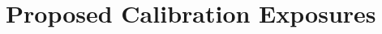 %
%
\section{Proposed Calibration Exposures}
\label{sec:CalibrationExposures}

\begingroup                             %
\newcommand{\DspotProjector}{D_{\mbox{\tiny spot}}} %
\newcommand{\OverfillFactor}{f_D}                   %
\newcommand{\DlambdaFilter}{\Delta_\lambda}         %
\newcommand{\DlambdaFlat}{\Delta_{\lambda,\mbox{\tiny flat}}}   %
\newcommand{\DlambdaOffset}{\Delta_{\lambda,\mbox{\tiny hole}}} %
\newcommand{\DlambdaWhite}{\Delta_{\lambda,\mbox{\tiny white}}} %
\newcommand{\Nband}{N_b}                                        %
\newcommand{\NPointPerFilter}{N_{\lambda/\mbox{\tiny filter}}}  %
\newcommand{\NspotCCD}{N_{\mbox{\tiny CCD}}}                    %
\newcommand{\Noffset}{N_{\mbox{\tiny offset}}}                  %
\newcommand{\NFlat}{N_{\mbox{\tiny flat}}}                      %
\newcommand{\Tdark}{t_{\mbox{\tiny dark}}}                      %
\newcommand{\Tflat}{t_{\mbox{\tiny flat}}}                      %
\newcommand{\Tspot}{t_{\mbox{\tiny spot}}}                      %
\newcommand{\FracBandwidth}{f_{\mbox{\tiny bandwidth}}}         %

\newcommand{\DspotProjectorNominal}{0.3\mbox{m}}
\newcommand{\OverfillFactorNominal}{2}
\newcommand{\DlambdaFilterNominal}{1\mbox{\tiny nm}}
\newcommand{\DlambdaFlatNominal}{100\mbox{\tiny nm}}
\newcommand{\DlambdaOffsetNominal}{100\mbox{\tiny nm}}
\newcommand{\DlambdaWhiteNominal}{10\mbox{\tiny nm}}
\newcommand{\NbandNominal}{6}
\newcommand{\NPointPerFilterNominal}{2}
\newcommand{\NspotCCDNominal}{5}
\newcommand{\NoffsetNominal}{9}         %
\newcommand{\NFlatNominal}{10}
\newcommand{\TdarkNominal}{1000\mbox{\tiny s}}
\newcommand{\TflatNominal}{13\mbox{\tiny s}}
\newcommand{\TspotNominal}{45\mbox{\tiny s}}
\newcommand{\FracBandwidthNominal}{0.5}

